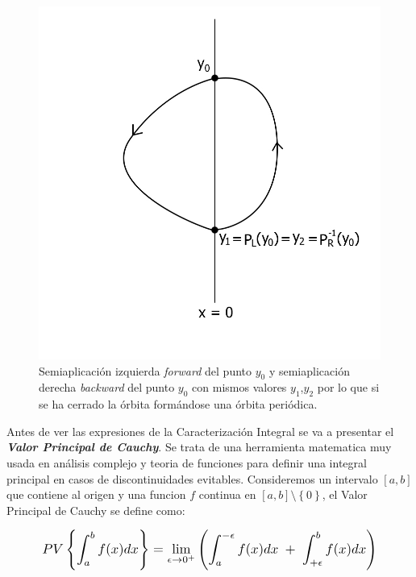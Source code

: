 \documentclass[12pt,a4paper]{report} %
\begin{document}
	\begin{figure}[h]
		\centering
		\includegraphics[width=1\textwidth]{aplipoincareL-Rcerrado.jpg}
		\caption{Semiaplicación izquierda \textit{forward} del punto $y_0$ y semiaplicación derecha \textit{backward} del punto $y_0$ con mismos valores $y_1$,$y_2$ por lo que si se ha cerrado la órbita formándose una órbita periódica.}
		\label{fig:aplipoincareL-Rcerrado}
	\end{figure}\smallskip
	
	\newpage 
		
	\vspace{0.5cm} Antes de ver las expresiones de la Caracterización Integral se va a presentar el \textit{\textbf{Valor Principal de Cauchy}}. Se trata de una herramienta matematica muy usada en análisis complejo y teoria de funciones para definir una integral principal en casos de discontinuidades evitables. Consideremos un intervalo $[a,b]$ que contiene al origen y una funcion $f$ continua en $[a,b] \setminus \left\{0\right\}$, el Valor Principal de Cauchy se define como:

	\begin{equation}
		\scalebox{1.2}{$\displaystyle
		 PV\left\{\int_{a}^{b}f(x)dx\right\}= \lim_{\epsilon \to 0^+}\left(
		\int_{a}^{-\epsilon}f(x)dx \; + \; 
		\int_{+\epsilon}^{b}f(x)dx
		\right)
		$}
	\end{equation}\smallskip
	
\end{document}

